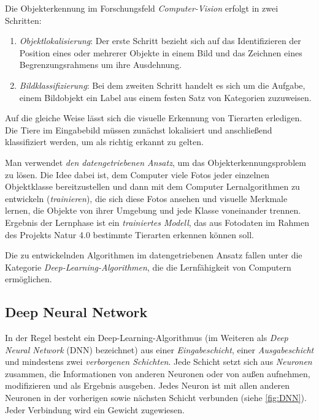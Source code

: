 Die Objekterkennung im Forschungsfeld \emph{Computer-Vision} erfolgt in zwei Schritten:

\begin{enumerate}
	\item \emph{Objektlokalisierung}: Der erste Schritt bezieht sich auf das Identifizieren der Position eines oder mehrerer Objekte in einem Bild und das Zeichnen eines Begrenzungsrahmens um ihre Ausdehnung.
	
	\item \emph{Bildklassifizierung}: Bei dem zweiten Schritt handelt es sich um die Aufgabe, einem Bildobjekt ein Label aus einem festen Satz von Kategorien zuzuweisen.
\end{enumerate}

Auf die gleiche Weise lässt sich die visuelle Erkennung von Tierarten erledigen. Die Tiere im Eingabebild müssen zunächst lokalisiert und anschließend klassifiziert werden, um als richtig erkannt zu gelten.

Man verwendet \emph{den datengetriebenen Ansatz}, um das Objekterkennungsproblem zu lösen. Die Idee dabei ist, dem Computer viele Fotos jeder einzelnen Objektklasse bereitzustellen und dann mit dem Computer Lernalgorithmen zu entwickeln (\emph{trainieren}), die sich diese Fotos ansehen und visuelle Merkmale lernen, die Objekte von ihrer Umgebung und jede Klasse voneinander trennen. Ergebnis der Lernphase ist ein \emph{trainiertes Modell}, das aus Fotodaten im Rahmen des Projekts Natur 4.0 bestimmte Tierarten erkennen können soll.

Die zu entwickelnden Algorithmen im datengetriebenen Ansatz fallen unter die Kategorie \emph{Deep-Learning-Algorithmen}, die die Lernfähigkeit von Computern ermöglichen.

\subsection{Deep Neural Network}

In der Regel besteht ein Deep-Learning-Algorithmus (im Weiteren als \emph{Deep Neural Network} (DNN) bezeichnet) aus einer \emph{Eingabeschicht}, einer \emph{Ausgabeschicht} und mindestens zwei \emph{verborgenen Schichten}. Jede Schicht setzt sich aus \emph{Neuronen} zusammen, die Informationen von anderen Neuronen oder von außen aufnehmen, modifizieren und als Ergebnis ausgeben. Jedes Neuron ist mit allen anderen Neuronen in der vorherigen sowie nächsten Schicht verbunden (siehe \autoref{fig:DNN}). Jeder Verbindung wird ein Gewicht zugewiesen.


